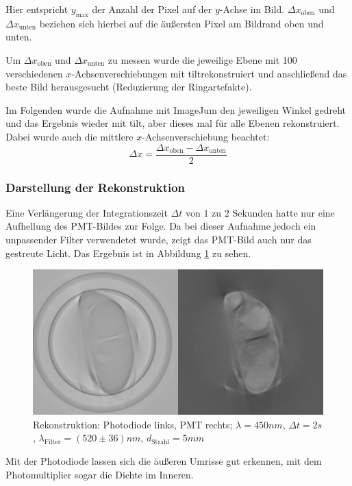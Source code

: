 Hier entspricht $y_\text{max}$ der Anzahl der Pixel auf der $y$-Achse im Bild.
$\Delta{x_\text{oben}}$ und $\Delta{x_\text{unten}}$ beziehen sich hierbei auf die äußersten Pixel am Bildrand oben und unten.

Um $\Delta{x_{\text{oben}}}$ und $\Delta{x_{\text{unten}}}$ zu messen wurde die jeweilige Ebene mit 100 verschiedenen $x$-Achsenverschiebungen mit  \glqq tilt\grqq rekonstruiert und anschließend das beste Bild herausgesucht (Reduzierung der Ringartefakte).

Im Folgenden wurde die Aufnahme mit \glqq ImageJ\grqq um den jeweiligen Winkel gedreht und das Ergebnis wieder mit  \glqq tilt\grqq , aber dieses mal für alle Ebenen rekonstruiert.
Dabei wurde auch die mittlere $x$-Achsenverschiebung beachtet:
$$\Delta{x} = \frac{\Delta{x_{\text{oben}}} - \Delta{x_{\text{unten}}}}{2}$$

\subsubsection{Darstellung der Rekonstruktion}
Eine Verlängerung der Integrationszeit $\Delta{t}$ von $1$ zu $2$ Sekunden hatte nur eine Aufhellung des PMT-Bildes zur Folge.
Da bei dieser Aufnahme jedoch ein unpassender Filter verwendetet wurde, zeigt das PMT-Bild auch nur das gestreute Licht. Das Ergebnis ist in Abbildung \ref{fig:lang-int} zu sehen.

\begin{figure}[ht]
\centering
\includegraphics[width=\linewidth]{IMAGE/both-2-450-5-1.png}
\caption{Rekonstruktion: Photodiode links, PMT rechts; $\lambda = 450 \si{nm}$, $\Delta{t} = 2 \si{s}$, $\lambda_\text{Filter} = (520 \pm 36) \si{nm}$, $d_\text{Strahl} = 5 \si{mm}$}
	\label{fig:lang-int}
\end{figure}

Mit der Photodiode lassen sich die äußeren Umrisse gut erkennen, mit dem Photomultiplier sogar die Dichte im Inneren.

